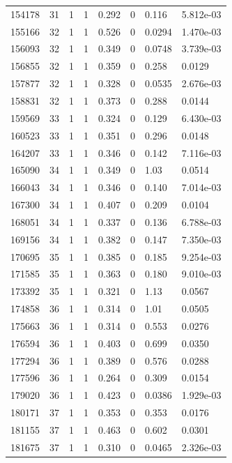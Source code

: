 \documentclass[preview]{standalone}
\begin{document}
{{{{{{{{{{{{{{{{\begin{tabular}{L{1.2cm}C{1.2cm} C{0.3cm}C{0.5cm} C{1.4cm}C{1.4cm} C{1.4cm}C{1.4cm}}
  154178  &    31  & 1     &  1 &  0.292  & 0  & 0.116 &  5.812e-03   \\ 
  155166  &    32  & 1     &  1 &  0.526  & 0  & 0.0294 &  1.470e-03   \\ 
  156093  &    32  & 1     &  1 &  0.349  & 0  & 0.0748 &  3.739e-03   \\ 
  156855  &    32  & 1     &  1 &  0.359  & 0  & 0.258 &  0.0129   \\ 
  157877  &    32  & 1     &  1 &  0.328  & 0  & 0.0535 &  2.676e-03   \\ 
  158831  &    32  & 1     &  1 &  0.373  & 0  & 0.288 &  0.0144   \\ 
  159569  &    33  & 1     &  1 &  0.324  & 0  & 0.129 &  6.430e-03   \\ 
  160523  &    33  & 1     &  1 &  0.351  & 0  & 0.296 &  0.0148   \\ 
  164207  &    33  & 1     &  1 &  0.346  & 0  & 0.142 &  7.116e-03   \\ 
  165090  &    34  & 1     &  1 &  0.349  & 0  & 1.03 &  0.0514   \\ 
  166043  &    34  & 1     &  1 &  0.346  & 0  & 0.140 &  7.014e-03   \\ 
  167300  &    34  & 1     &  1 &  0.407  & 0  & 0.209 &  0.0104   \\ 
  168051  &    34  & 1     &  1 &  0.337  & 0  & 0.136 &  6.788e-03   \\ 
  169156  &    34  & 1     &  1 &  0.382  & 0  & 0.147 &  7.350e-03   \\ 
  170695  &    35  & 1     &  1 &  0.385  & 0  & 0.185 &  9.254e-03   \\ 
  171585  &    35  & 1     &  1 &  0.363  & 0  & 0.180 &  9.010e-03   \\ 
  173392  &    35  & 1     &  1 &  0.321  & 0  & 1.13 &  0.0567   \\ 
  174858  &    36  & 1     &  1 &  0.314  & 0  & 1.01 &  0.0505   \\ 
  175663  &    36  & 1     &  1 &  0.314  & 0  & 0.553 &  0.0276   \\ 
  176594  &    36  & 1     &  1 &  0.403  & 0  & 0.699 &  0.0350   \\ 
  177294  &    36  & 1     &  1 &  0.389  & 0  & 0.576 &  0.0288   \\ 
  177596  &    36  & 1     &  1 &  0.264  & 0  & 0.309 &  0.0154   \\ 
  179020  &    36  & 1     &  1 &  0.423  & 0  & 0.0386 &  1.929e-03   \\ 
  180171  &    37  & 1     &  1 &  0.353  & 0  & 0.353 &  0.0176   \\ 
  181155  &    37  & 1     &  1 &  0.463  & 0  & 0.602 &  0.0301   \\ 
  181675  &    37  & 1     &  1 &  0.310  & 0  & 0.0465 &  2.326e-03   \\ 
\hline 
\end{tabular} 

}}}}}}}}}}}}}}}}
\end{document}
